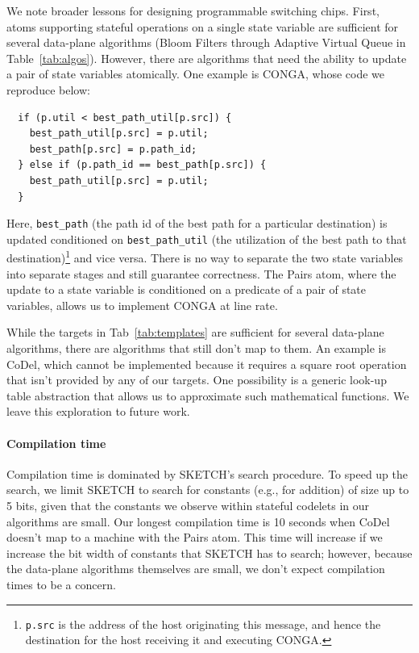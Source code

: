 We note broader lessons for designing programmable switching chips.  First,
atoms supporting stateful operations on a single state variable are sufficient
for several data-plane algorithms (Bloom Filters through Adaptive Virtual Queue
in Table~\ref{tab:algos}). However, there are algorithms that need the ability
to update a pair of state variables atomically. One example is CONGA, whose
code we reproduce below:
\begin{verbatim}
  if (p.util < best_path_util[p.src]) {
    best_path_util[p.src] = p.util;
    best_path[p.src] = p.path_id;
  } else if (p.path_id == best_path[p.src]) {
    best_path_util[p.src] = p.util;
  }
\end{verbatim}
Here, \texttt{best\_path} (the path id of the best path for a particular
destination) is updated conditioned on \texttt{best\_path\_util} (the
utilization of the best path to that destination)\footnote{{\tt p.src} is the
  address of the host originating this message, and hence the destination for
the host receiving it and executing CONGA.} and vice versa. There is no way to
separate the two state variables into separate stages and still guarantee
correctness. The Pairs atom, where the update to a state variable is conditioned
on a predicate of a pair of state variables, allows us to implement CONGA at
line rate.

While the targets in Tab~\ref{tab:templates} are sufficient for several
data-plane algorithms, there are algorithms that still don't map to them. An
example is CoDel, which cannot be implemented because it requires a square root
operation that isn't provided by any of our targets. One possibility is a
generic look-up table abstraction that allows us to approximate such
mathematical functions. We leave this exploration to future work.
\paragraph{Compilation time}
Compilation time is dominated by SKETCH's search procedure.  To speed up the
search, we limit SKETCH to search for constants (e.g., for addition) of size up
to 5 bits, given that the constants we observe within stateful codelets in our
algorithms are small. Our longest compilation time is 10 seconds when CoDel
doesn't map to a \absmachine machine with the Pairs atom.  This time will
increase if we increase the bit width of constants that SKETCH has to search;
however, because the data-plane algorithms themselves are small, we don't
expect compilation times to be a concern.


